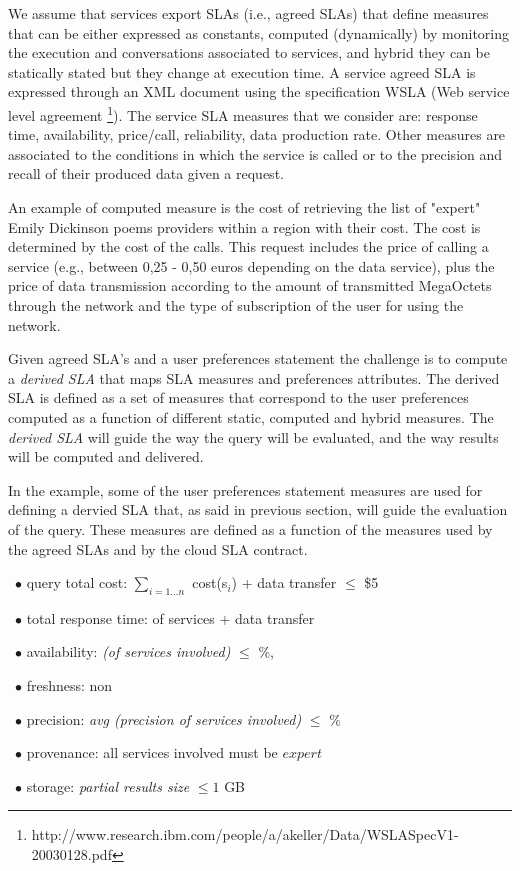 We assume that services export SLAs (i.e., agreed SLAs) that define measures   that can be either expressed as constants,  computed (dynamically) by monitoring the execution and conversations associated to services, and hybrid they can be statically stated  but they change at execution time.  A service  agreed SLA is expressed through an  XML document using the specification WSLA (Web service level agreement \footnote{\footnotesize http://www.research.ibm.com/people/a/akeller/\-Data/WSLASpecV1-20030128.pdf}). The service SLA measures  that we consider are: response time, availability, price/call, reliability, data production rate. Other measures are associated to the conditions in which the service is called or to the precision and recall of their produced data given a request. 

An example of computed measure is the cost of retrieving the list of "expert" Emily Dickinson poems providers within a region with their cost. The cost is determined by the  cost of the calls. This request  includes the price of calling a service (e.g.,  between 0,25 - 0,50 euros depending on the data service), plus the price of data transmission according to the amount of transmitted MegaOctets through the network and the type of subscription of the user for using the network. 

Given agreed SLA's and a user preferences statement the challenge is to compute a  {\em derived SLA} that  maps SLA measures and preferences attributes.  The derived SLA is defined as a set of measures that correspond to the user preferences computed as a function of different static, computed and hybrid measures. The {\em derived SLA}  will guide the way the query will be evaluated, and the way results will be computed and delivered.

In the example, some of the user preferences statement measures are used for defining a dervied SLA that, as said in previous section, will guide the evaluation of the query. These measures are defined as a function of the measures used by the agreed SLAs and by the cloud SLA contract.
\begin{trivlist}\sf\footnotesize
\item[~$\bullet$ ] query total cost: $\sum_{i = 1\dots n}$ cost(s$_i$) + data transfer $\leq$ \$5
 \item[~$\bullet$ ] total response time: of services + data transfer
 \item[~$\bullet$ ] availability: {\em (of services involved)} $\leq$ {$\%$}, 
 \item[~$\bullet$ ] freshness: non 
 \item[~$\bullet$ ] precision: {\em avg (precision of services involved)} $\leq$ {$\%$}
 \item[~$\bullet$ ] provenance:  all services involved must be $expert$
 \item[~$\bullet$ ] storage: {\em partial results size} $\leq 1$ GB
 \end{trivlist} 
 
